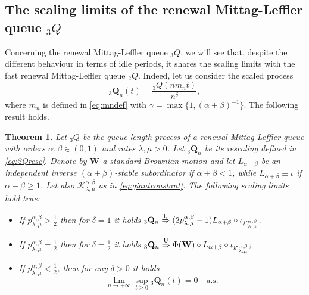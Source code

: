 \documentclass[]{amsart}
\numberwithin{equation}{section}
\newtheorem{thm}{Theorem}[section]
\theoremstyle{remark}
\theoremstyle{definition}
\begin{document}
\subsection{The scaling limits of the renewal Mittag-Leffler queue ${}_3{Q}$}
Concerning the renewal Mittag-Leffler queue ${}_3{Q}$, we will see that, despite the different behaviour in terms of idle periods, it shares the scaling limits with the fast renewal Mittag-Leffler queue ${}_2Q$. Indeed, let us consider the scaled process
\begin{equation}\label{eq:2Qresc}
	{}_3{\mathbf{Q}}_n(t)=\frac{{}_3{Q}(nm_n t)}{n^\delta},
\end{equation}
where $m_n$ is defined in \eqref{eq:mndef} with $\gamma=\max\{1,(\alpha+\beta)^{-1}\}$. The following result holds.
\begin{thm}\label{thm:scalingmodel3}
	Let ${}_3Q$ be the queue length process of a renewal Mittag-Leffler queue with orders $\alpha,\beta \in (0,1)$ and rates $\lambda,\mu>0$. Let ${}_3\mathbf{Q}_n$ be its rescaling defined in \eqref{eq:2Qresc}. Denote by $\mathbf{W}$ a standard Brownian motion and let $L_{\alpha+\beta}$ be an independent inverse $(\alpha+\beta)$-stable subordinator if $\alpha+\beta<1$, while $L_{\alpha+\beta}\equiv \iota$ if $\alpha+\beta \ge 1$. Let also $\mathcal{K}_{\lambda,\mu}^{\alpha,\beta}$ as in \eqref{eq:giantconstant}.
	The following scaling limits hold true:
	\begin{itemize}
		\item[$(i)$] If $p_{\lambda,\mu}^{\alpha,\beta}>\frac{1}{2}$ then for $\delta=1$ it holds
		${}_3{\mathbf{Q}}_n \overset{\sf U}{\Rightarrow}(2p_{\lambda,\mu}^{\alpha,\beta}-1)L_{\alpha+\beta}\circ \iota_{\mathcal{K}_{\lambda,\mu}^{\alpha,\beta}}$.
		\item[$(ii)$] If $p_{\lambda,\mu}^{\alpha,\beta}=\frac{1}{2}$ then for $\delta=\frac{1}{2}$ it holds ${}_3{\mathbf{Q}}_n \overset{\sf U}{\Rightarrow} \Phi(\mathbf{W})\circ L_{\alpha+\beta}\circ \iota_{\mathcal{K}_{\lambda,\mu}^{\alpha,\beta}}$;
		\item[$(iii)$] If $p_{\lambda,\mu}^{\alpha,\beta}<\frac{1}{2}$, then for any $\delta>0$ it holds 
		\begin{equation*}
			\lim_{n \to +\infty}\sup_{t \ge 0}{}_3\mathbf{Q}_n(t)=0 \quad \mbox{a.s.}
		\end{equation*}
	\end{itemize}
\end{thm}
\end{document}
